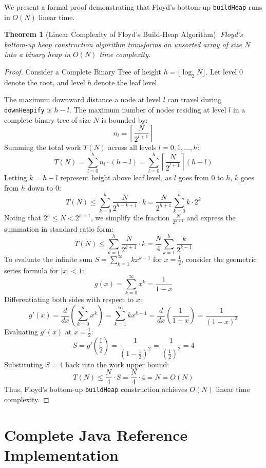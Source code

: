 \documentclass[10pt,journal,compsoc,onecolumn]{IEEEtran}
\newtheorem{theorem}{Theorem}
\begin{document}
We present a formal proof demonstrating that Floyd's bottom-up \texttt{buildHeap} runs in $O(N)$ linear time.

\begin{theorem}[Linear Complexity of Floyd's Build-Heap Algorithm]
Floyd's bottom-up heap construction algorithm transforms an unsorted array of size $N$ into a binary heap in $O(N)$ time complexity.
\end{theorem}

\begin{proof}
Consider a Complete Binary Tree of height $h = \lfloor \log_2 N \rfloor$. Let level $0$ denote the root, and level $h$ denote the leaf level. 

The maximum downward distance a node at level $l$ can travel during \texttt{downHeapify} is $h - l$. The maximum number of nodes residing at level $l$ in a complete binary tree of size $N$ is bounded by:
\[
n_l = \left\lceil \frac{N}{2^{l+1}} \right\rceil
\]
Summing the total work $T(N)$ across all levels $l = 0, 1, \dots, h$:
\[
T(N) = \sum_{l=0}^{h} n_l \cdot (h - l) = \sum_{l=0}^{h} \left\lceil \frac{N}{2^{l+1}} \right\rceil (h - l)
\]
Letting $k = h - l$ represent height above leaf level, as $l$ goes from $0$ to $h$, $k$ goes from $h$ down to $0$:
\[
T(N) \le \sum_{k=0}^{h} \frac{N}{2^{h - k + 1}} \cdot k = \frac{N}{2^{h+1}} \sum_{k=0}^{h} k \cdot 2^k
\]
Noting that $2^h \le N < 2^{h+1}$, we simplify the fraction $\frac{N}{2^{h+1}}$ and express the summation in standard ratio form:
\[
T(N) \le \sum_{k=1}^{h} \frac{N}{2^{k+1}} \cdot k = \frac{N}{4} \sum_{k=1}^{h} \frac{k}{2^{k-1}}
\]
To evaluate the infinite sum $S = \sum_{k=1}^{\infty} k x^{k-1}$ for $x = \frac{1}{2}$, consider the geometric series formula for $|x| < 1$:
\[
g(x) = \sum_{k=0}^{\infty} x^k = \frac{1}{1 - x}
\]
Differentiating both sides with respect to $x$:
\[
g'(x) = \frac{d}{dx} \left( \sum_{k=0}^{\infty} x^k \right) = \sum_{k=1}^{\infty} k x^{k-1} = \frac{d}{dx} \left( \frac{1}{1 - x} \right) = \frac{1}{(1 - x)^2}
\]
Evaluating $g'(x)$ at $x = \frac{1}{2}$:
\[
S = g'\left(\frac{1}{2}\right) = \frac{1}{\left(1 - \frac{1}{2}\right)^2} = \frac{1}{\left(\frac{1}{2}\right)^2} = 4
\]
Substituting $S = 4$ back into the work upper bound:
\[
T(N) \le \frac{N}{4} \cdot S = \frac{N}{4} \cdot 4 = N = O(N)
\]
Thus, Floyd's bottom-up \texttt{buildHeap} construction achieves $O(N)$ linear time complexity.
\end{proof}

\section{Complete Java Reference Implementation}
\label{sec:java-impl}
\end{document}
